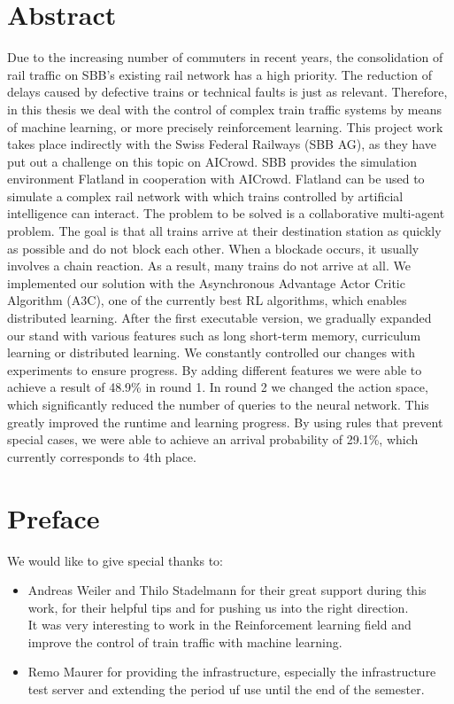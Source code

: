 \newpage
\thispagestyle{empty}
\chapter*{Abstract}\label{abstract}
Due to the increasing number of commuters in recent years, the consolidation of rail traffic on SBB's existing rail network has a high priority.
The reduction of delays caused by defective trains or technical faults is just as relevant.
Therefore, in this thesis we deal with the control of complex train traffic systems by means of machine learning, or more precisely reinforcement learning.
This project work takes place indirectly with the Swiss Federal Railways (SBB AG), as they have put out a challenge on this topic on AICrowd.
SBB provides the simulation environment Flatland in cooperation with AICrowd. Flatland can be used to simulate a complex rail network with which trains controlled by artificial intelligence can interact.
The problem to be solved is a collaborative multi-agent problem. The goal is that all trains arrive at their destination station as quickly as possible and do not block each other. When a blockade occurs, it usually involves a chain reaction. As a result, many trains do not arrive at all.
We implemented our solution with the Asynchronous Advantage Actor Critic Algorithm (A3C), one of the currently best RL algorithms, which enables distributed learning.
After the first executable version, we gradually expanded our stand with various features such as long short-term memory, curriculum learning or distributed learning.
We constantly controlled our changes with experiments to ensure progress.
By adding different features we were able to achieve a result of 48.9\% in round 1.
In round 2 we changed the action space, which significantly reduced the number of queries to the neural network. This greatly improved the runtime and learning progress.
By using rules that prevent special cases, we were able to achieve an arrival probability of 29.1\%, which currently corresponds to 4th place.


\chapter*{Preface}\label{preface}
We would like to give special thanks to:
\begin{itemize}
    \item Andreas Weiler and Thilo Stadelmann for their great support during this work, for their helpful tips and for pushing us into the right direction.\\It was very interesting to work in the Reinforcement learning field and improve the control of train traffic with machine learning.
    \item Remo Maurer for providing the infrastructure, especially the infrastructure test server and extending the period uf use until the end of the semester.
\end{itemize}


